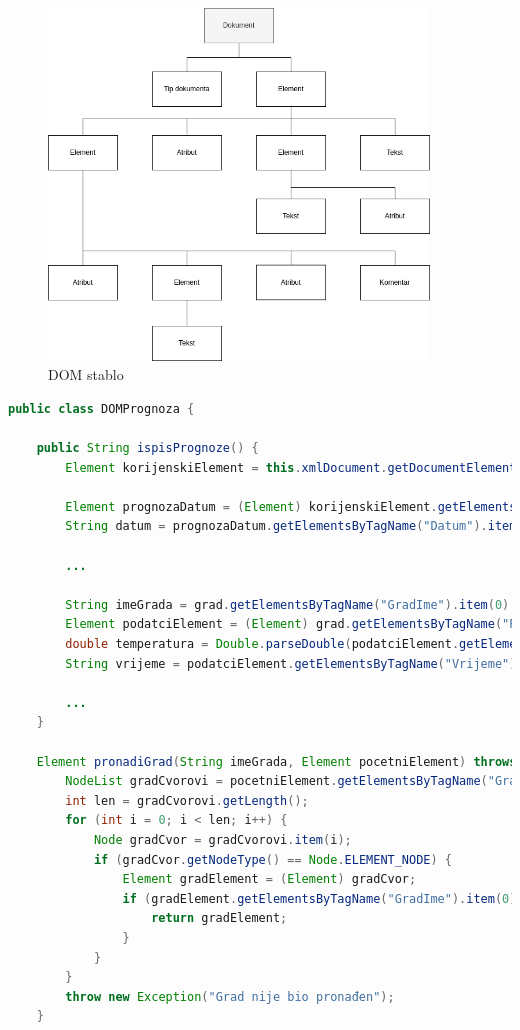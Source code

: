 \documentclass{foi}
\begin{document}
\begin{figure}[h!]
	\centering
	\includegraphics[width=0.9\textwidth]{slike/DOM_stablo.png}
	\caption{DOM stablo}
\end{figure}

\begin{lstlisting}[language=java, caption={Dohvačanje vrijednosti iz DOM stabla}]
public class DOMPrognoza {

    public String ispisPrognoze() {
        Element korijenskiElement = this.xmlDocument.getDocumentElement();

        Element prognozaDatum = (Element) korijenskiElement.getElementsByTagName("DatumTermin").item(0);
        String datum = prognozaDatum.getElementsByTagName("Datum").item(0).getTextContent();

        ...

        String imeGrada = grad.getElementsByTagName("GradIme").item(0).getTextContent();
        Element podatciElement = (Element) grad.getElementsByTagName("Podatci").item(0);
        double temperatura = Double.parseDouble(podatciElement.getElementsByTagName("Temp").item(0).getTextContent());
        String vrijeme = podatciElement.getElementsByTagName("Vrijeme").item(0).getTextContent();

        ...
    }

    Element pronadiGrad(String imeGrada, Element pocetniElement) throws Exception {
        NodeList gradCvorovi = pocetniElement.getElementsByTagName("Grad");
        int len = gradCvorovi.getLength();
        for (int i = 0; i < len; i++) {
            Node gradCvor = gradCvorovi.item(i);
            if (gradCvor.getNodeType() == Node.ELEMENT_NODE) {
                Element gradElement = (Element) gradCvor;
                if (gradElement.getElementsByTagName("GradIme").item(0).getTextContent().equals(imeGrada)) {
                    return gradElement;
                }
            }
        }
        throw new Exception("Grad nije bio pronađen");
    }
\end{lstlisting}
\end{document}
